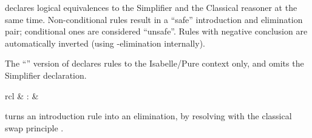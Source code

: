 \begin{isabellebody}
\begin{isamarkuptext}
\begin{description}
  \item \hyperlink{attribute.iff}{\mbox{}} declares logical equivalences to the
  Simplifier and the Classical reasoner at the same time.
  Non-conditional rules result in a ``safe'' introduction and
  elimination pair; conditional ones are considered ``unsafe''.  Rules
  with negative conclusion are automatically inverted (using -elimination internally).

  The ``'' version of \hyperlink{attribute.iff}{\mbox{}} declares rules to
  the Isabelle/Pure context only, and omits the Simplifier
  declaration.

  \end{description}%
\end{isamarkuptext}%
\isamarkuptrue%
%
\isamarkuptrue%
%
\begin{isamarkuptext}%
\begin{matharray}{rcl}
    \hypertarget{attribute.swapped}{\hyperlink{attribute.swapped}{\mbox{}}} & : &  \\
  \end{matharray}

  \begin{description}

  \item \hyperlink{attribute.swapped}{\mbox{}} turns an introduction rule into an
  elimination, by resolving with the classical swap principle .


\end{description}
\end{isamarkuptext}
\end{isabellebody}
